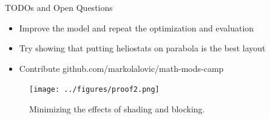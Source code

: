 \documentclass[10pt, xcolor={dvipsnames}]{beamer}
\begin{document}
\begin{frame}{TODOs and Open Questions}
\begin{itemize}
\item Improve the model and repeat the optimization and evaluation
\item Try showing that putting heliostats on parabola is the best layout
\item Contribute github.com/markolalovic/math-mods-camp
\end{itemize}

\begin{center}
\begin{figure}[H]
\texttt{[image: ../figures/proof2.png]}
\caption{Minimizing the effects of shading and blocking.}
\end{figure}
\end{center}

\end{frame}
\end{document}
